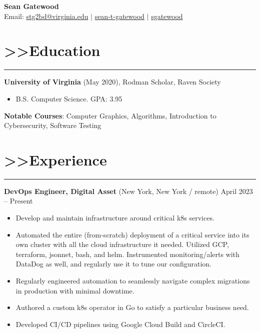 \documentclass[letterpaper,10pt]{article}
\begin{document}
\begin{center}
    \Large{\textbf{Sean Gatewood}}\\[0.5em]
    \normalsize
    Email: \href{mailto:stg2bd@virginia.edu}{stg2bd@virginia.edu} $\vert$ \href{https://linkedin.com/in/sean-t-gatewood}{sean-t-gatewood} $\vert$ \href{https://github.com/sgatewood}{sgatewood}
\end{center}

\vspace{-2.9em}


\newcommand{\heading}[1]
{
    \section*{\textgreater\textgreater \space #1}
    \vspace{-0.9em}
    \rule{\linewidth}{0.4pt}
}

\heading{Education}
\textbf{University of Virginia} (May 2020), Rodman Scholar, Raven Society
\begin{itemize}
    \item B.S. Computer Science. GPA: 3.95\\
\end{itemize}

\noindent\textbf{Notable Courses}: Computer Graphics, Algorithms, Introduction to Cybersecurity, Software Testing
\vspace{-1em}

\newenvironment{job}[3]
{
    \noindent\textbf{#1} (#2) \hfill #3
    \begin{minipage}{0.8\textwidth}
    \begin{itemize}
}
{
    \end{itemize}
    \end{minipage}
}

\heading{Experience}

\begin{job}
{DevOps Engineer, Digital Asset}
{New York, New York / remote}
{April 2023 -- Present}
    \item Develop and maintain infrastructure around critical k8s services.
    \item Automated the entire (from-scratch) deployment of a critical service into its own cluster with all the cloud infrastructure it needed. Utilized GCP, terraform, jsonnet, bash, and helm. Instrumented monitoring/alerts with DataDog as well, and regularly use it to tune our configuration.
    \item Regularly engineered automation to seamlessly navigate complex migrations in production with minimal downtime.
    \item Authored a custom k8s operator in Go to satisfy a particular business need.
    \item Developed CI/CD pipelines using Google Cloud Build and CircleCI.
\end{job}
\end{document}
